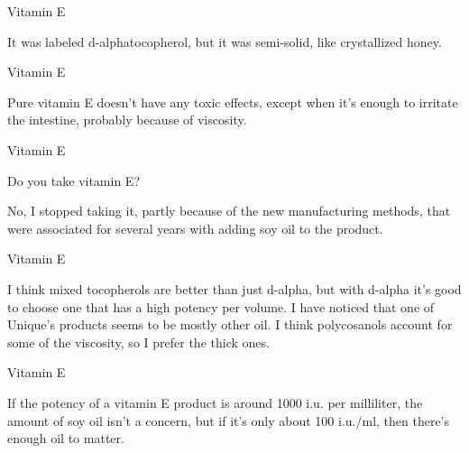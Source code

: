 \documentclass[11pt,oneside,openany,extrafontsizes]{memoir}
\begin{document}
\begin{standalonequote}{Vitamin E}

    \begin{answer}
        It was labeled d-alphatocopherol, but it was semi-solid, like crystallized honey.
    \end{answer}
\end{standalonequote}

\begin{standalonequote}{Vitamin E}

    \begin{answer}
        Pure vitamin E doesn't have any toxic effects, except when it's enough to irritate the intestine, probably because of viscosity.
    \end{answer}
\end{standalonequote}

\begin{qaexchange}{Vitamin E}

    \begin{question}
        Do you take vitamin E?
    \end{question}

    \begin{answer}
        No, I stopped taking it, partly because of the new manufacturing methods, that were associated for several years with adding soy oil to the product.
    \end{answer}
\end{qaexchange}

\begin{standalonequote}{Vitamin E}

    \begin{answer}
        I think mixed tocopherols are better than just d-alpha, but with d-alpha it's good to choose one that has a high potency per volume. I have noticed that one of Unique's products seems to be mostly other oil. I think polycosanols account for some of the viscosity, so I prefer the thick ones.
    \end{answer}
\end{standalonequote}

\begin{standalonequote}{Vitamin E}

    \begin{answer}
        If the potency of a vitamin E product is around 1000 i.u. per milliliter, the amount of soy oil isn't a concern, but if it's only about 100 i.u./ml, then there's enough oil to matter.
    \end{answer}
\end{standalonequote}
\end{document}
